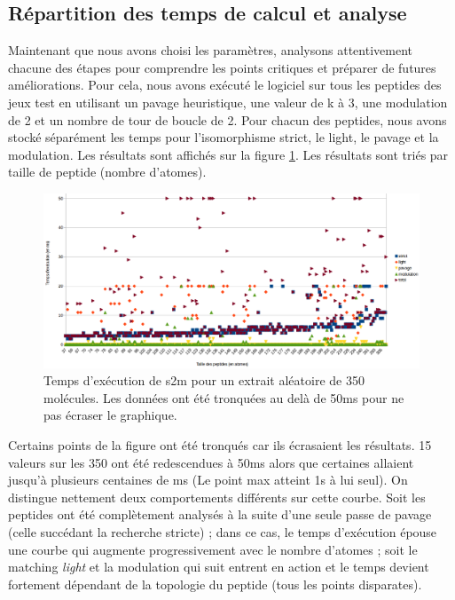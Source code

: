 \subsection{Répartition des temps de calcul et analyse}
\label{temps_calcul}

Maintenant que nous avons choisi les paramètres, analysons attentivement chacune des étapes pour comprendre les points critiques et préparer de futures améliorations.
Pour cela, nous avons exécuté le logiciel sur tous les peptides des jeux test en utilisant un pavage heuristique, une valeur de k à 3, une modulation de 2 et un nombre de tour de boucle de 2.
Pour chacun des peptides, nous avons stocké séparément les temps pour l'isomorphisme strict, le light, le pavage et la modulation.
Les résultats sont affichés sur la figure \ref{temps_calcul}.
Les résultats sont triés par taille de peptide (nombre d'atomes).

\begin{figure}[!ht]
  \begin{center}
    \includegraphics[width=450px]{Figures/s2m/results/temps_detail.png}
    \caption{\label{temps_calcul}Temps d'exécution de s2m pour un extrait aléatoire de 350 molécules.
    Les données ont été tronquées au delà de 50ms pour ne pas écraser le graphique.}
  \end{center}
\end{figure}

Certains points de la figure ont été tronqués car ils écrasaient les résultats.
15 valeurs sur les 350 ont été redescendues à 50ms alors que certaines allaient jusqu'à plusieurs centaines de ms (Le point max atteint 1s à lui seul).
On distingue nettement deux comportements différents sur cette courbe.
Soit les peptides ont été complètement analysés à la suite d'une seule passe de pavage (celle succédant la recherche stricte) ; dans ce cas, le temps d'exécution épouse une courbe qui augmente progressivement avec le nombre d'atomes ; soit le matching \textit{light} et la modulation qui suit entrent en action et le temps devient fortement dépendant de la topologie du peptide (tous les points disparates).

